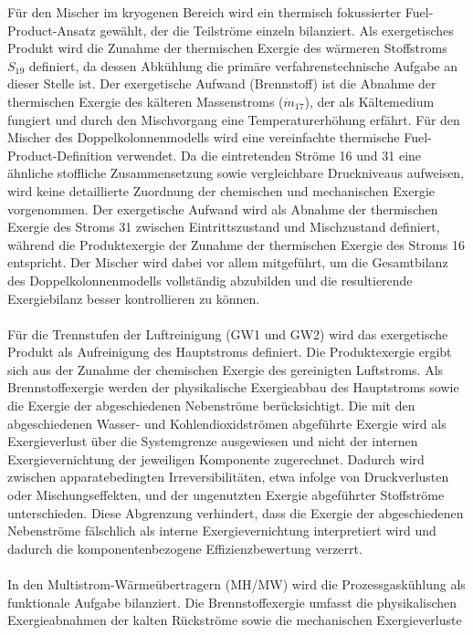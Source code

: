 Für den Mischer im kryogenen Bereich wird ein thermisch fokussierter Fuel-Product-Ansatz gewählt, der die Teilströme einzeln bilanziert. Als exergetisches Produkt wird die Zunahme der thermischen Exergie des wärmeren Stoffstroms \(S_{19}\) definiert, da dessen Abkühlung die primäre verfahrenstechnische Aufgabe an dieser Stelle ist. Der exergetische Aufwand (Brennstoff) ist die Abnahme der thermischen Exergie des kälteren Massenstroms ($\dot{m}_{17}$), der als Kältemedium fungiert und durch den Mischvorgang eine Temperaturerhöhung erfährt. Für den Mischer des Doppelkolonnenmodells wird eine vereinfachte thermische Fuel-Product-Definition verwendet. Da die eintretenden Ströme 16 und 31 eine
ähnliche stoffliche Zusammensetzung sowie vergleichbare Druckniveaus
aufweisen, wird keine detaillierte Zuordnung der chemischen und mechanischen
Exergie vorgenommen. Der exergetische Aufwand wird als Abnahme der thermischen
Exergie des Stroms 31 zwischen Eintrittszustand und Mischzustand definiert,
während die Produktexergie der Zunahme der thermischen Exergie des Stroms 16
entspricht. Der Mischer wird dabei vor allem mitgeführt, um die Gesamtbilanz
des Doppelkolonnenmodells vollständig abzubilden und die resultierende
Exergiebilanz besser kontrollieren zu können.\\
\\
Für die Trennstufen der Luftreinigung (GW1 und GW2) wird das exergetische Produkt als Aufreinigung des Hauptstroms definiert. Die Produktexergie ergibt sich aus der Zunahme der chemischen Exergie des gereinigten Luftstroms. Als Brennstoffexergie werden der physikalische Exergieabbau des Hauptstroms sowie die Exergie der abgeschiedenen Nebenströme berücksichtigt. Die mit den abgeschiedenen Wasser- und Kohlendioxidströmen abgeführte Exergie wird als Exergieverlust über die Systemgrenze ausgewiesen und nicht der internen Exergievernichtung der jeweiligen Komponente zugerechnet. Dadurch wird zwischen apparatebedingten Irreversibilitäten, etwa infolge von Druckverlusten oder Mischungseffekten, und der ungenutzten Exergie abgeführter Stoffströme unterschieden. Diese Abgrenzung verhindert, dass die Exergie der abgeschiedenen Nebenströme fälschlich als interne Exergievernichtung interpretiert wird und dadurch die komponentenbezogene Effizienzbewertung verzerrt.\\
\\
In den Multistrom-Wärmeübertragern (MH/MW) wird die Prozessgaskühlung als
funktionale Aufgabe bilanziert. Die Brennstoffexergie umfasst die physikalischen
Exergieabnahmen der kalten Rückströme sowie die mechanischen Exergieverluste
